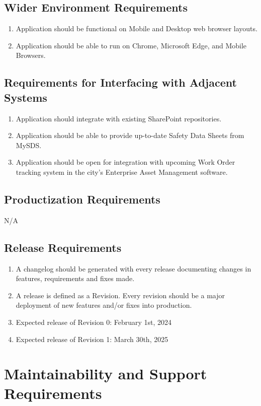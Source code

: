 \documentclass[12pt]{article}
\begin{document}
\subsection{Wider Environment Requirements}
\begin{enumerate} [{OE-WE}1.]
  \item Application should be functional on Mobile and Desktop web
    browser layouts.
  \item Application should be able to run on Chrome, Microsoft Edge,
    and Mobile Browsers.
\end{enumerate}
\subsection{Requirements for Interfacing with Adjacent Systems}
\begin{enumerate} [{OE-IAS}1.]
  \item Application should integrate with existing SharePoint repositories.
  \item Application should be able to provide up-to-date Safety Data
    Sheets from MySDS.
  \item Application should be open for integration with upcoming Work
    Order tracking system in the city's Enterprise Asset Management software.
\end{enumerate}
\subsection{Productization Requirements}
N/A
\subsection{Release Requirements}
\begin{enumerate} [{OE-REL}1.]
  \item A changelog should be generated with every release
    documenting changes in features, requirements and fixes made.
  \item A release is defined as a Revision. Every revision should be
    a major deployment of new features and/or fixes into production.
  \item Expected release of Revision 0: February 1st, 2024
  \item Expected release of Revision 1: March 30th, 2025
\end{enumerate}

\section{Maintainability and Support Requirements}
\end{document}
